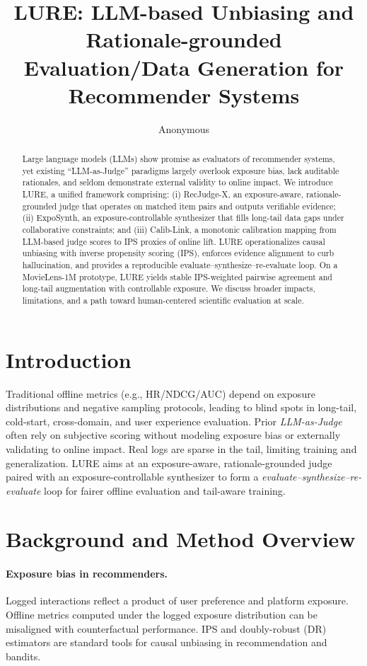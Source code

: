 \documentclass[10pt]{article}
\title{LURE: LLM-based Unbiasing and Rationale-grounded Evaluation/Data Generation for Recommender Systems}
\author{Anonymous}
\date{}
\begin{document}
\maketitle

\begin{abstract}
Large language models (LLMs) show promise as evaluators of recommender systems, yet existing “LLM-as-Judge” paradigms largely overlook exposure bias, lack auditable rationales, and seldom demonstrate external validity to online impact. We introduce LURE, a unified framework comprising: (i) RecJudge-X, an exposure-aware, rationale-grounded judge that operates on matched item pairs and outputs verifiable evidence; (ii) ExpoSynth, an exposure-controllable synthesizer that fills long-tail data gaps under collaborative constraints; and (iii) Calib-Link, a monotonic calibration mapping from LLM-based judge scores to IPS proxies of online lift. LURE operationalizes causal unbiasing with inverse propensity scoring (IPS), enforces evidence alignment to curb hallucination, and provides a reproducible evaluate–synthesize–re-evaluate loop. On a MovieLens-1M prototype, LURE yields stable IPS-weighted pairwise agreement and long-tail augmentation with controllable exposure. We discuss broader impacts, limitations, and a path toward human-centered scientific evaluation at scale.
\end{abstract}

\section{Introduction}
Traditional offline metrics (e.g., HR/NDCG/AUC) depend on exposure distributions and negative sampling protocols, leading to blind spots in long-tail, cold-start, cross-domain, and user experience evaluation. Prior \emph{LLM-as-Judge} often rely on subjective scoring without modeling exposure bias or externally validating to online impact. Real logs are sparse in the tail, limiting training and generalization. LURE aims at an exposure-aware, rationale-grounded judge paired with an exposure-controllable synthesizer to form a \emph{evaluate–synthesize–re-evaluate} loop for fairer offline evaluation and tail-aware training.

\section{Background and Method Overview}
\paragraph{Exposure bias in recommenders.} Logged interactions reflect a product of user preference and platform exposure. Offline metrics computed under the logged exposure distribution can be misaligned with counterfactual performance. IPS and doubly-robust (DR) estimators are standard tools for causal unbiasing in recommendation and bandits.
\end{document}

